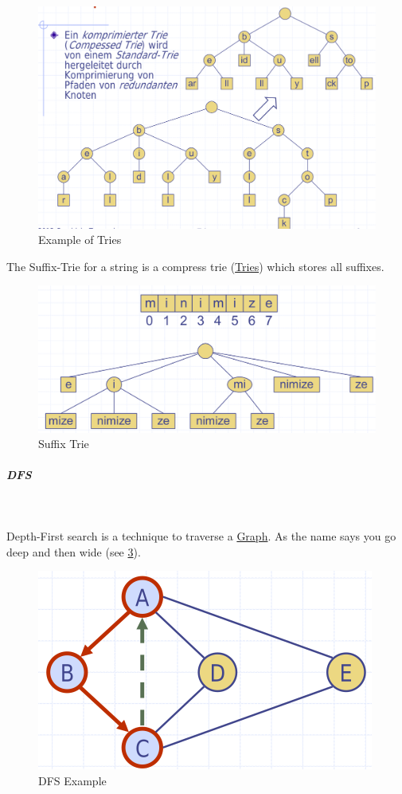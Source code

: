 \documentclass[11pt,twoside,twocolumn,landscape]{article}
\begin{document}
\begin{figure}[htbp]
\centering
\includegraphics[width=.9\linewidth]{img/tries.png}
\caption{\label{fig:org774941e}Example of Tries}
\end{figure}


The Suffix-Trie for a string is a compress trie (\href{../../../roam/20220201152933-tries.org}{Tries}) which stores all suffixes.

\begin{figure}[htbp]
\centering
\includegraphics[width=.9\linewidth]{img/suffix_trie.png}
\caption{\label{fig:org966085a}Suffix Trie}
\end{figure}

\subparagraph{DFS} \
\label{sec:org3bba586}

Depth-First search is a technique to traverse a \href{../../../roam/20220201163000-graph.org}{Graph}.
As the name says you go deep and then wide (see \ref{fig:orgc4ef129}).


\begin{figure}[htbp]
\centering
\includegraphics[width=.9\linewidth]{img/dfs.png}
\caption{\label{fig:orgc4ef129}DFS Example}
\end{figure}
\end{document}
